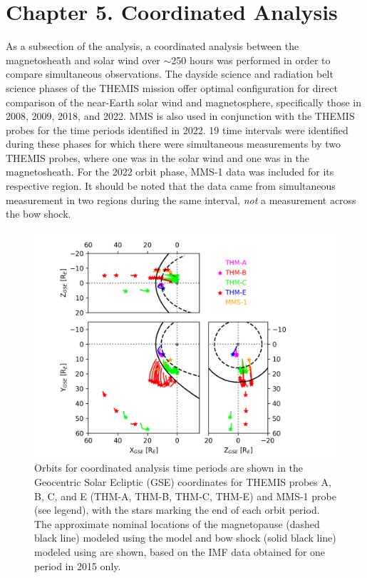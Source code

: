 \chapter{Chapter 5. Coordinated Analysis}
As a subsection of the analysis, a coordinated analysis between the magnetosheath and solar wind over $\sim$250 hours was performed in order to compare simultaneous observations.  The dayside science and radiation belt science phases of the THEMIS mission offer optimal configuration for direct comparison of the near-Earth solar wind and magnetosphere, specifically those in 2008, 2009, 2018, and 2022. MMS is also used in conjunction with the THEMIS probes for the time periods identified in 2022. 19 time intervals were identified during these phases for which there were simultaneous measurements by two THEMIS probes, where one was in the solar wind and one was in the magnetosheath. For the 2022 orbit phase, MMS-1 data was included for its respective region. It should be noted that the data came from simultaneous measurement in two regions during the same interval, \textit{not} a measurement across the bow shock. 

\begin{figure}
    \centering
    \includegraphics[width=\textwidth]{Figures/Orbits/all_TE_orbits_xy_xz_yz_coordinated.png}
    \caption[Orbits for coordinated observation periods]{Orbits for coordinated analysis time periods are shown in the Geocentric Solar Ecliptic (GSE) coordinates for THEMIS probes A, B, C, and E (THM-A, THM-B, THM-C, THM-E) and MMS-1 probe (see legend), with the stars marking the end of each orbit period. The approximate nominal locations of the magnetopause (dashed black line) modeled using the \cite{Shue:1997} model and bow shock (solid black line) modeled using \cite{SlavinHolzer:1984} are shown, based on the IMF data obtained for one period in 2015 only.}
    \label{fig:coordinated-orbits-plot}
\end{figure}


